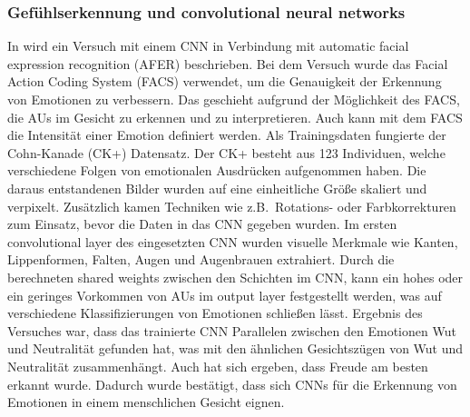 \subsubsection*{Gefühlserkennung und convolutional neural networks}
In \cite{facialemotionrecusingcnn} wird ein Versuch mit einem CNN in Verbindung mit automatic facial expression recognition (AFER) beschrieben. Bei dem Versuch wurde das Facial Action Coding System (FACS) verwendet, um die Genauigkeit der Erkennung von Emotionen zu verbessern. Das geschieht aufgrund der Möglichkeit des FACS, die AUs im Gesicht zu erkennen und zu interpretieren. Auch kann mit dem FACS die Intensität einer Emotion definiert werden. Als Trainingsdaten fungierte der Cohn-Kanade (CK+) Datensatz. Der CK+ besteht aus 123 Individuen, welche verschiedene Folgen von emotionalen Ausdrücken aufgenommen haben. Die daraus entstandenen Bilder wurden auf eine einheitliche Größe skaliert und verpixelt. Zusätzlich kamen Techniken wie z.B.~Rotations- oder Farbkorrekturen zum Einsatz, bevor die Daten in das CNN gegeben wurden. Im ersten convolutional layer des eingesetzten CNN wurden visuelle Merkmale wie Kanten, Lippenformen, Falten, Augen und Augenbrauen extrahiert. Durch die berechneten shared weights zwischen den Schichten im CNN, kann ein hohes oder ein geringes Vorkommen von AUs im output layer festgestellt werden, was auf verschiedene Klassifizierungen von Emotionen schließen lässt. Ergebnis des Versuches war, dass das trainierte CNN Parallelen zwischen den Emotionen Wut und Neutralität gefunden hat, was mit den ähnlichen Gesichtszügen von Wut und Neutralität zusammenhängt. Auch hat sich ergeben, dass Freude am besten erkannt wurde. Dadurch wurde bestätigt, dass sich CNNs für die Erkennung von Emotionen in einem menschlichen Gesicht eignen.
\\
\\
